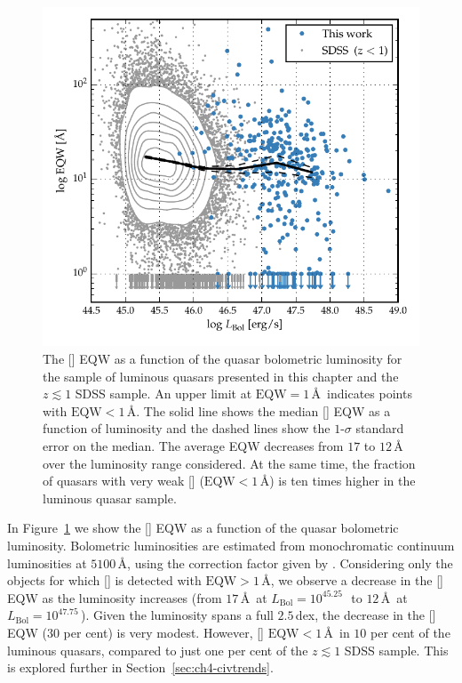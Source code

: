 \begin{figure}[t!]
\centering
    \includegraphics[width=\columnwidth]{figures/chapter04/eqw_lum.pdf}
    \caption[{The [] EQW as a function of the quasar bolometric luminosity.}]{The [] EQW as a function of the quasar bolometric luminosity for the sample of luminous quasars presented in this chapter and the $z\lesssim1$ SDSS sample. An upper limit at $\text{EQW}=1$\,\AA\, indicates points with $\text{EQW} < 1$\,\AA. The solid line shows the median [] EQW as a function of luminosity and the dashed lines show the $1$-$\sigma$ standard error on the median. The average EQW decreases from $17$ to $12$\,\AA\, over the luminosity range considered. At the same time, the fraction of quasars with very weak [] ($\text{EQW} < 1$\,\AA) is ten times higher in the luminous quasar sample.}
    \label{fig:eqw_lum}
\end{figure}

In Figure~\ref{fig:eqw_lum} we show the [] EQW as a function of the quasar bolometric luminosity.
Bolometric luminosities are estimated from monochromatic continuum luminosities at $5100$\,\AA, using the correction factor given by \citet{richards06}.
Considering only the objects for which [] is detected with $\text{EQW} > 1$\,\AA, we observe a decrease in the [] EQW as the luminosity increases (from $17$\,\AA\, at $L_{\text{Bol}}=10^{45.25}$\,\ergs\, to $12$\,\AA\, at $L_{\text{Bol}}=10^{47.75}$\,\ergs).
Given the luminosity spans a full $2.5$\,dex, the decrease in the [] EQW ($30$ per cent) is very modest.
However, [] $\text{EQW} < 1$\,\AA\, in $10$ per cent of the luminous quasars, compared to just one per cent of the $z \lesssim 1$ SDSS sample.
This is explored further in Section~\ref{sec:ch4-civtrends}.

